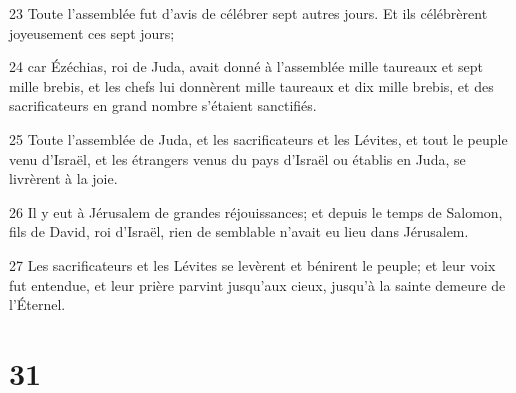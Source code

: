 \par 23 Toute l'assemblée fut d'avis de célébrer sept autres jours. Et ils célébrèrent joyeusement ces sept jours;
\par 24 car Ézéchias, roi de Juda, avait donné à l'assemblée mille taureaux et sept mille brebis, et les chefs lui donnèrent mille taureaux et dix mille brebis, et des sacrificateurs en grand nombre s'étaient sanctifiés.
\par 25 Toute l'assemblée de Juda, et les sacrificateurs et les Lévites, et tout le peuple venu d'Israël, et les étrangers venus du pays d'Israël ou établis en Juda, se livrèrent à la joie.
\par 26 Il y eut à Jérusalem de grandes réjouissances; et depuis le temps de Salomon, fils de David, roi d'Israël, rien de semblable n'avait eu lieu dans Jérusalem.
\par 27 Les sacrificateurs et les Lévites se levèrent et bénirent le peuple; et leur voix fut entendue, et leur prière parvint jusqu'aux cieux, jusqu'à la sainte demeure de l'Éternel.

\chapter{31}

